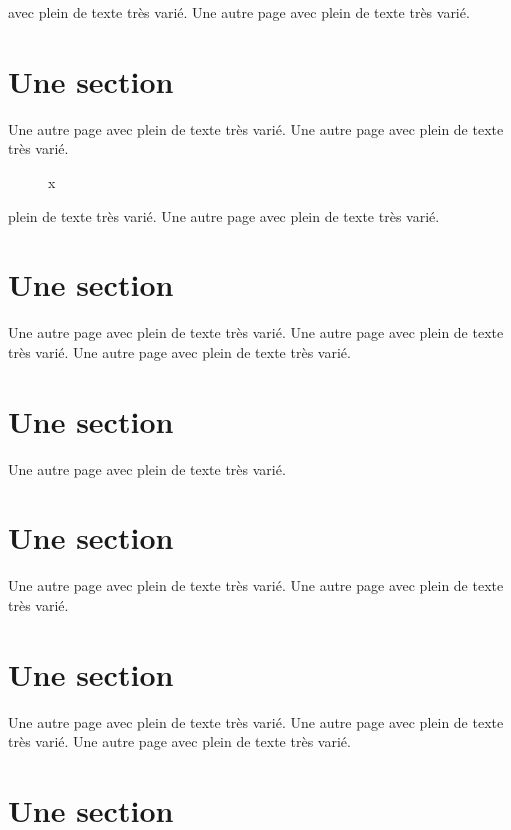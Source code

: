 \documentclass[11pt]{thesul}
\begin{document}
avec plein de texte très varié.
Une autre page avec plein de texte très varié.

\section{Une section}

Une autre page avec plein de texte très varié.
Une autre page avec plein de texte très varié.

\begin{figure}[htb]
\caption{x}
\end{figure}

\DontFrameChaptersInToc

\Annexes


plein de texte très varié.
Une autre page avec plein de texte très varié.

\section{Une section}

Une autre page avec plein de texte très varié.
Une autre page avec plein de texte très varié.
Une autre page avec plein de texte très varié.

\section{Une section}

Une autre page avec plein de texte très varié.

\section{Une section}

Une autre page avec plein de texte très varié.
Une autre page avec plein de texte très varié.

\section{Une section}

Une autre page avec plein de texte très varié.
Une autre page avec plein de texte très varié.
Une autre page avec plein de texte très varié.

\section{Une section}
\end{document}
